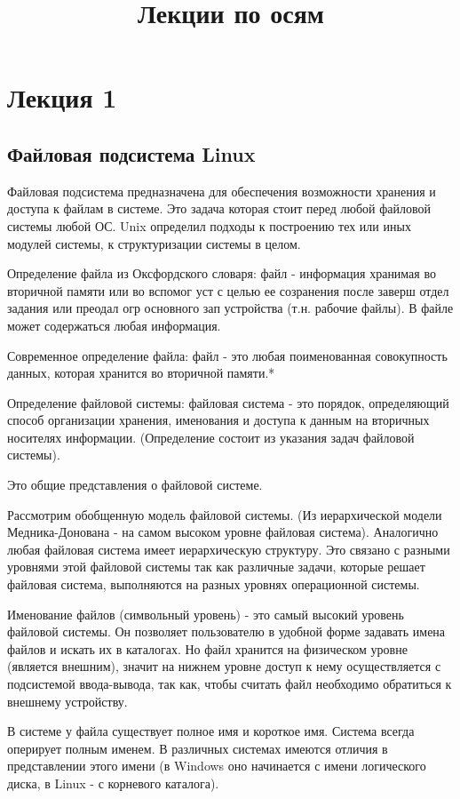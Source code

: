 \title{Лекции по осям}
\chapter{Лекция 1}
\section{Файловая подсистема Linux}
Файловая подсистема предназначена для обеспечения возможности хранения и доступа к файлам в системе. Это задача которая стоит перед любой файловой системы любой ОС. Unix определил подходы к построению тех или иных модулей системы, к структуризации системы в целом. 

Определение файла из Оксфордского словаря: файл - информация хранимая во вторичной памяти или во вспомог уст с целью ее созранения после заверш отдел задания или преодал огр основного зап устройства (т.н. рабочие файлы). В файле может содержаться любая информация.

Современное определение файла: файл - это любая поименованная совокупность данных, которая хранится во вторичной памяти.*

Определение файловой системы: файловая система - это порядок, определяющий способ организации хранения, именования и доступа к данным на вторичных носителях информации. (Определение состоит из указания задач файловой системы).

Это общие представления о файловой системе.

Рассмотрим обобщенную модель файловой системы. (Из иерархической модели Медника-Донована - на самом высоком уровне файловая система). Аналогично любая файловая система имеет иерархическую структуру. Это связано с разными уровнями этой файловой системы так как различные задачи, которые решает файловая система, выполняются на разных уровнях операционной системы.

Именование файлов (символьный уровень) - это самый высокий уровень файловой системы. Он позволяет пользователю в удобной форме задавать имена файлов и искать их в каталогах. Но файл хранится на физическом уровне (является внешним), значит на нижнем уровне доступ к нему осуществляется с подсистемой ввода-вывода, так как, чтобы считать файл необходимо обратиться к внешнему устройству.

\begin{figure}[H]
	\center{\texttt{[image: -1]}}
\end{figure}

В системе у файла существует полное имя и короткое имя. Система всегда оперирует полным именем. В различных системах имеются отличия в представлении этого имени (в Windows оно начинается с имени логического диска, в Linux - с корневого каталога).


